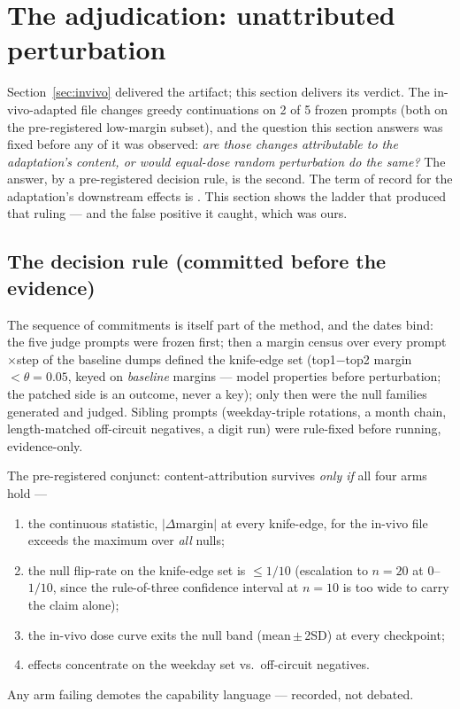 \section{The adjudication: unattributed perturbation}
\label{sec:adjudication}

Section~\ref{sec:invivo} delivered the artifact; this section delivers
its verdict. The in-vivo-adapted file changes greedy continuations on
2 of 5 frozen prompts (both on the pre-registered low-margin subset),
and the question this section answers was fixed before any of it was
observed: \emph{are those changes attributable to the adaptation's
content, or would equal-dose random perturbation do the same?} The
answer, by a pre-registered decision rule, is the second. The term of
record for the adaptation's downstream effects is
\unattrib{}. This section shows the ladder that produced that ruling
--- and the false positive it caught, which was ours.

\subsection{The decision rule (committed before the evidence)}
\label{sec:rule}

The sequence of commitments is itself part of the method, and the
dates bind: the five judge prompts were frozen first; then a margin
census over every prompt$\times$step of the baseline dumps defined the
knife-edge set (top1$-$top2 margin $< \theta = 0.05$, keyed on
\emph{baseline} margins --- model properties before perturbation; the
patched side is an outcome, never a key); only then were the null
families generated and judged. Sibling prompts (weekday-triple
rotations, a month chain, length-matched off-circuit negatives, a
digit run) were rule-fixed before running, evidence-only.

The pre-registered conjunct: content-attribution survives \emph{only
if} all four arms hold ---
\begin{enumerate}
\item[(a)] the continuous statistic, $|\Delta\mathrm{margin}|$ at every
  knife-edge, for the in-vivo file exceeds the maximum over
  \emph{all} nulls;
\item[(b)] the null flip-rate on the knife-edge set is $\le 1/10$
  (escalation to $n{=}20$ at $0$--$1/10$, since the rule-of-three
  confidence interval at $n{=}10$ is too wide to carry the claim
  alone);
\item[(c)] the in-vivo dose curve exits the null band
  (mean\,$\pm$\,2SD) at every checkpoint;
\item[(d)] effects concentrate on the weekday set vs.\ off-circuit
  negatives.
\end{enumerate}
Any arm failing demotes the capability language --- recorded, not
debated.

